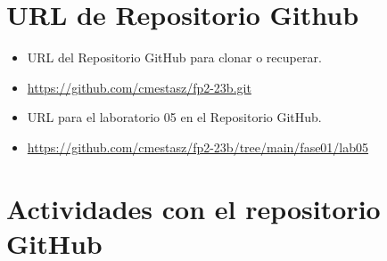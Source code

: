 \documentclass{article}
\begin{document}
\section{URL de Repositorio Github}
\begin{itemize}
	\item URL del Repositorio GitHub para clonar o recuperar.
	\item \url{https://github.com/cmestasz/fp2-23b.git}
	\item URL para el laboratorio 05 en el Repositorio GitHub.
	\item \url{https://github.com/cmestasz/fp2-23b/tree/main/fase01/lab05}
\end{itemize}

\section{Actividades con el repositorio GitHub}
\end{document}
